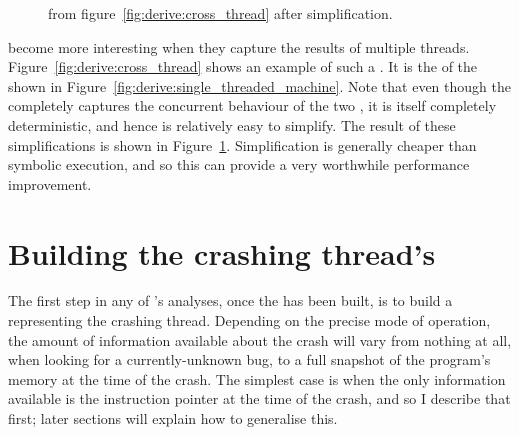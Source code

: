 \begin{figure}
  \begin{center}
  \end{center}
  \caption{{\STateMachine} from figure~\ref{fig:derive:cross_thread}
    after {\StateMachine} simplification.}
  \label{fig:derive:cross_thread_opt}
\end{figure}

{\STateMachines} become more interesting when they capture the results
of multiple threads.  Figure~\ref{fig:derive:cross_thread} shows an
example of such a {\StateMachine}.  It is the
 of the {\StateMachines} shown in
Figure~\ref{fig:derive:single_threaded_machine}.  Note that even
though the {\StateMachine} completely captures the concurrent
behaviour of the two {\StateMachines}, it is itself completely
deterministic, and hence is relatively easy to simplify.  The result
of these simplifications is shown in
Figure~\ref{fig:derive:cross_thread_opt}.  Simplification is generally
cheaper than symbolic execution, and so this can provide a very
worthwhile performance improvement.

\section{Building the crashing thread's \StateMachine}

The first step in any of {\technique}'s analyses, once the
 has been built, is to build a {\StateMachine}
representing the crashing thread.  Depending on the precise mode of
operation, the amount of information available about the crash will
vary from nothing at all, when looking for a currently-unknown bug, to
a full snapshot of the program's memory at the time of the crash.  The
simplest case is when the only information available is the
instruction pointer at the time of the crash, and so I describe that
first; later sections will explain how to generalise this.

